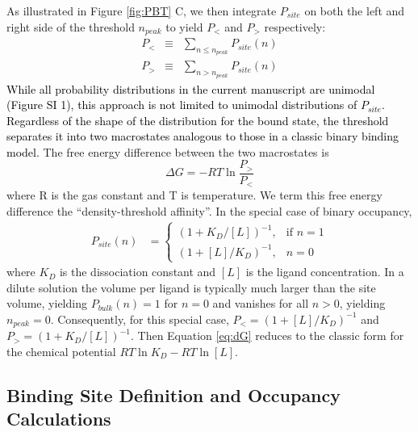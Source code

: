 \documentclass[%
 aip,
 amsmath,amssymb,
 preprint,%
]{revtex4-1}\usepackage{setspace}
\newcommand{\newaffinity}{density-threshold affinity}
\newcommand{\liam}[1]{\textcolor{black}{#1}}
\newcommand{\grace}[1]{\textcolor{black}{{#1}}}
\begin{document}
As illustrated in Figure \ref{fig:PBT} C, we then integrate $P_{site}$ on both the left and right side of the threshold $n_{peak}$ to yield $P_{<}$ and $P_{>}$ respectively:
\begin{eqnarray}
    P_{<}& \equiv &\sum\nolimits_{n\le n_{peak}} P_{site}(n) \label{eq:Pl} \\
    P_{>}& \equiv &\sum\nolimits_{n>n_{peak}} P_{site}(n)  \label{eq:Pg}
\end{eqnarray}
 \grace{While all probability distributions in the current manuscript are unimodal (\liam{Figure SI 1}), this approach is not limited to unimodal distributions of $P_{site}$. Regardless of the shape of the distribution for the bound state, the threshold separates it into two macrostates analogous to those in a classic binary binding model.}   %
The free energy difference between the two macrostates is
\begin{equation}
\Delta G = -RT\ln\frac{P_{>}}{P_{<}}
\label{eq:dG}
\end{equation}
where R is the gas constant and T is temperature. We term this free energy difference the ``\newaffinity''.  In the special case of binary occupancy, 
\begin{eqnarray}
P_{site}(n)&= 
\begin{cases}
    (1+ K_{D}/[L])^{-1},& \text{if } n = 1\\
    (1+ [L]/K_{D})^{-1},& n=0
\end{cases}
\end{eqnarray}
where $K_{D}$ is the dissociation constant and $[L]$ is the ligand concentration. In a dilute solution the volume per ligand is typically much larger than the site volume, yielding $P_{bulk} (n)=1$ for $n=0$ and vanishes for all $n>0$, yielding $n_{peak} = 0$. Consequently, for this special case, $P_{<} = (1+ [L]/K_{D})^{-1}$ and $P_{>} = (1+ K_{D}/[L])^{-1}$. 
Then Equation \ref{eq:dG} reduces to the classic form for the chemical potential $RT\ln K_{D}-  RT\ln [L]$. 

\subsection{Binding Site Definition and Occupancy Calculations}
\end{document}
